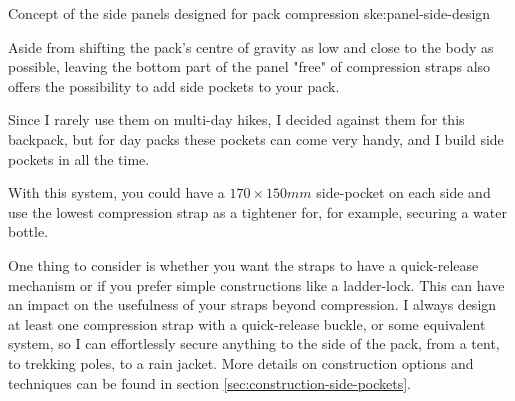 {Concept of the side panels designed for pack compression}
{ske:panel-side-design}

Aside from shifting the pack's centre of gravity as low and close to the body as possible, leaving the bottom part of the panel "free" of compression straps also offers the possibility to add side pockets to your pack.

Since I rarely use them on multi-day hikes, I decided against them for this backpack, but for day packs these pockets can come very handy, and I build side pockets in all the time.

\begin{note}
   With this system, you could have a $170 \times 150mm$ side-pocket on each side and use the lowest compression strap as a tightener for, for example, securing a water bottle.
\end{note}

One thing to consider is whether you want the straps to have a quick-release mechanism or if you prefer simple constructions like a ladder-lock. This can have an impact on the usefulness of your straps beyond compression. I always design at least one compression strap with a quick-release buckle, or some equivalent system, so I can effortlessly secure anything to the side of the pack, from a tent, to trekking poles, to a rain jacket. More details on construction options and techniques can be found in section \ref{sec:construction-side-pockets}.

